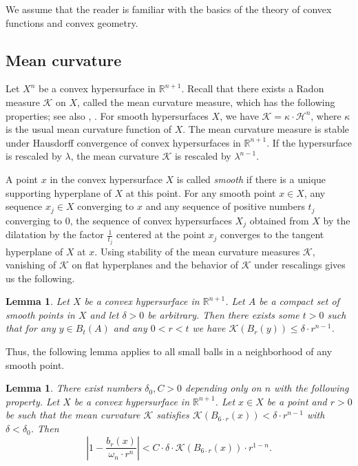 \documentclass[12pt,leqno,intlimits]{amsart}
\numberwithin{equation}{section}
\newtheorem{lem}[thm]{Lemma}
\theoremstyle{definition}
\theoremstyle{remark}
\newcommand{\R}{\mathbb{R}}
\begin{document}
We assume that the reader is familiar with the basics of the theory of convex functions and convex geometry.

\subsection{Mean curvature}
Let $X^n$ be a convex hypersurface in $\R ^{n+1}$. Recall that there exists a Radon measure $\mathcal K$ on $X$, called the mean curvature measure, which has the following properties; see also \cite{Schneider}, \cite{Fedcurvature}.
For smooth hypersurfaces $X$, we have $\mathcal K=\kappa \cdot \mathcal H^n$, where $\kappa$ is the usual mean curvature function of $X$.
The mean curvature measure is stable under Hausdorff convergence of convex hypersurfaces in $\R^{n+1}$. 
If the hypersurface is rescaled by $\lambda$, the mean curvature $\mathcal K$ is rescaled by $\lambda^{n-1}$. %

A point $x$ in the convex hypersurface $X$ is called \emph{smooth} if there is a unique supporting hyperplane of $X$ at this point.
For any smooth point $x\in X$, any sequence $x_j\in X$ converging to $x$ and any sequence of positive numbers $t_j$ converging to $0$, the
sequence of convex hypersurfaces $X_j$ obtained from $X$ by the dilatation by the factor $\frac 1 {t_j}$ centered at the point $x_j$ converges
to the tangent hyperplane of $X$ at $x$. Using stability of the mean curvature measures $\mathcal K$, vanishing of $\mathcal K$ on flat hyperplanes and
the behavior of $\mathcal K$ under rescalings gives us the following.

\begin{lem} \label{lem:compsm}
Let $X$ be a convex hypersurface in $\R^{n+1}$. Let $A$ be a compact set of smooth points in $X$ and let $\delta >0$ be arbitrary.
Then there exists some $t>0$ such that for any $y\in B_{t} (A)$ and any $0<r<t$ we have $\mathcal K(B_r(y)) \leq \delta \cdot r^{n-1}$.
\end{lem}
Thus, the following lemma applies to all small balls in a neighborhood of any smooth point.


\begin{lem} \label{lem:mean}
There exist numbers $\delta_0,C>0$ depending only on $n$ with the following property. Let $X$ be a convex hypersurface in $\R^{n+1}$.
Let $x\in X$ be a point and $r>0$ be such that the mean curvature $\mathcal K$ satisfies $\mathcal K(B_{6{\cdot}r} (x)) < \delta \cdot r^{n-1}$ with $\delta <\delta _0$.
Then
\begin{equation} \label{eq:lemma}
| 1 - \frac {b_r (x)} { \omega _n{\cdot}r^n}| < C\cdot \delta \cdot \mathcal K( B_{6{\cdot}r} (x)) \cdot r^{1-n}.
\end{equation}
\end{lem}
\end{document}
